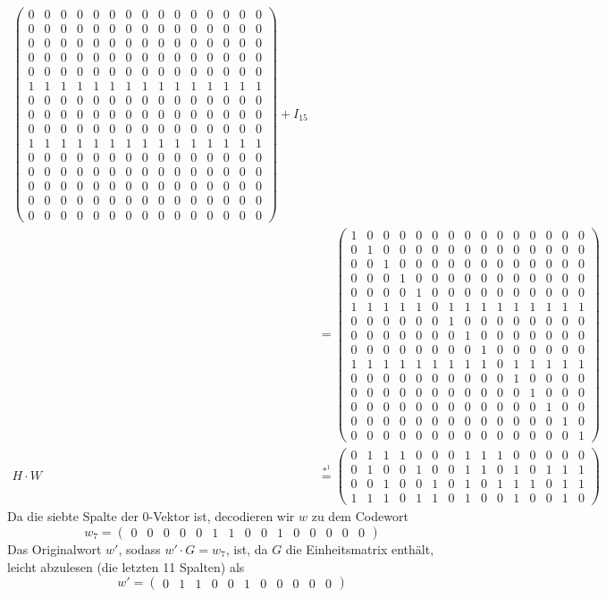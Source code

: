 \begin{myList}
\begin{align*}
\begin{pmatrix}
0&0&0&0&0&0&0&0&0&0&0&0&0&0&0\\
0&0&0&0&0&0&0&0&0&0&0&0&0&0&0\\
0&0&0&0&0&0&0&0&0&0&0&0&0&0&0\\
0&0&0&0&0&0&0&0&0&0&0&0&0&0&0\\
0&0&0&0&0&0&0&0&0&0&0&0&0&0&0\\
1&1&1&1&1&1&1&1&1&1&1&1&1&1&1\\
0&0&0&0&0&0&0&0&0&0&0&0&0&0&0\\
0&0&0&0&0&0&0&0&0&0&0&0&0&0&0\\
0&0&0&0&0&0&0&0&0&0&0&0&0&0&0\\
1&1&1&1&1&1&1&1&1&1&1&1&1&1&1\\
0&0&0&0&0&0&0&0&0&0&0&0&0&0&0\\
0&0&0&0&0&0&0&0&0&0&0&0&0&0&0\\
0&0&0&0&0&0&0&0&0&0&0&0&0&0&0\\
0&0&0&0&0&0&0&0&0&0&0&0&0&0&0\\
0&0&0&0&0&0&0&0&0&0&0&0&0&0&0
\end{pmatrix}+I_{15}\\
&=\begin{pmatrix}
1&0&0&0&0&0&0&0&0&0&0&0&0&0&0\\
0&1&0&0&0&0&0&0&0&0&0&0&0&0&0\\
0&0&1&0&0&0&0&0&0&0&0&0&0&0&0\\
0&0&0&1&0&0&0&0&0&0&0&0&0&0&0\\
0&0&0&0&1&0&0&0&0&0&0&0&0&0&0\\
1&1&1&1&1&0&1&1&1&1&1&1&1&1&1\\
0&0&0&0&0&0&1&0&0&0&0&0&0&0&0\\
0&0&0&0&0&0&0&1&0&0&0&0&0&0&0\\
0&0&0&0&0&0&0&0&1&0&0&0&0&0&0\\
1&1&1&1&1&1&1&1&1&0&1&1&1&1&1\\
0&0&0&0&0&0&0&0&0&0&1&0&0&0&0\\
0&0&0&0&0&0&0&0&0&0&0&1&0&0&0\\
0&0&0&0&0&0&0&0&0&0&0&0&1&0&0\\
0&0&0&0&0&0&0&0&0&0&0&0&0&1&0\\
0&0&0&0&0&0&0&0&0&0&0&0&0&0&1
\end{pmatrix}\\
H\cdot W&\overset{*^1}=\begin{pmatrix}
0&1&1&1&0&0&0&1&1&1&0&0&0&0&0\\
0&1&0&0&1&0&0&1&1&0&1&0&1&1&1\\
0&0&1&0&0&1&0&1&0&1&1&1&0&1&1\\
1&1&1&0&1&1&0&1&0&0&1&0&0&1&0
\end{pmatrix}
\end{align*}
Da die siebte Spalte der 0-Vektor ist, decodieren wir $w$ zu dem Codewort $$w_7=\begin{pmatrix}0&0&0&0&0&1&1&0&0&1&0&0&0&0&0\end{pmatrix}$$ Das Originalwort $w'$, sodass
$w'\cdot G=w_7$, ist, da $G$ die Einheitsmatrix enthält, leicht abzulesen (die letzten 11 Spalten) als
$$w'=\begin{pmatrix}0&1&1&0&0&1&0&0&0&0&0\end{pmatrix}$$
\end{myList}

